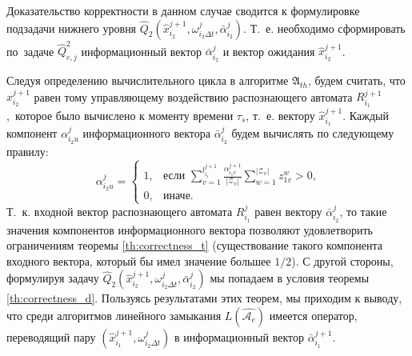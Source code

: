 \begin{Proof}
	Доказательство корректности в данном случае сводится к формулировке подзадачи нижнего уровня $\hat Q_2(\hat x_{i_2}^{j+1},\omega_{i_2\Delta t}^j,\bar\alpha_{i_2}^j)$. Т.~е. необходимо сформировать по~задаче $\hat Q_{e,j}^2$ информационный вектор $\bar\alpha_{i_2}^j$ и вектор ожидания $\hat x_{i_2}^{j+1}$.
	
	Следуя определению вычислительного цикла в алгоритме $\mathfrak A_{th}$, будем считать, что $\hat x_{i_2}^{j+1}$ равен тому управляющему воздействию распознающего автомата $R_{i_1}^{j+1}$,~которое было вычислено к моменту времени $\tau_s$, т.~е. вектору $\hat x_{i_1}^{j+1}$. Каждый компонент $\alpha_{i_2u}^j$ информационного вектора $\bar\alpha_{i_2}^j$ будем вычислять по следующему правилу:
	\begin{equation}
		\alpha_{i_2u}^j=\begin{cases}
			1, & \text{если $\sum\limits_{v=1}^{l_{i_1}^{j+1}}\frac{\alpha_{i_1v}^{j+1}}{|\mathcal{Z}_v|}\sum\limits_{w=1}^{|\mathcal{Z}_v|}z_{1v}^w>0$,}\\
			
			0, & \text{иначе.}
		\end{cases}
	\end{equation}
	Т.~к. входной вектор распознающего автомата $R_{i_1}^j$ равен вектору $\bar\alpha_{i_2}^j$, то такие значения компонентов информационного вектора позволяют удовлетворить ограничениям теоремы \ref{th:correctness_t} (существование такого компонента входного вектора, который бы имел значение большее $1/2$). С другой стороны, формулируя задачу $\hat Q_2(\hat x_{i_2}^{j+1},\omega_{i_2\Delta t}^j,\bar\alpha_{i_2}^j)$ мы попадаем в условия теоремы \ref{th:correctness_d}. Пользуясь результатами этих теорем, мы приходим к выводу, что среди алгоритмов линейного замыкания $L(\hat{\mathcal A_e})$ имеется оператор, переводящий пару $(\hat x_{i_1}^{j+1},\omega_{i_2\Delta t}^j)$ в информационный вектор $\bar\alpha_{i_1}^{j+1}$.
\end{Proof}


